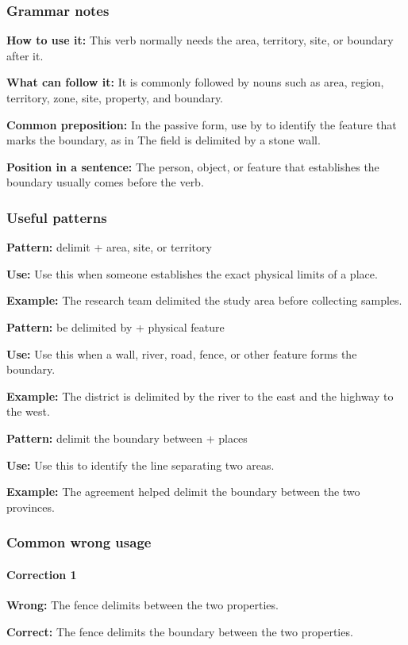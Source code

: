 \documentclass[11pt]{article}
\begin{document}
\subsubsection{Grammar notes}
\textbf{How to use it:} This verb normally needs the area, territory, site, or boundary after it.

\textbf{What can follow it:} It is commonly followed by nouns such as area, region, territory, zone, site, property, and boundary.

\textbf{Common preposition:} In the passive form, use by to identify the feature that marks the boundary, as in The field is delimited by a stone wall.

\textbf{Position in a sentence:} The person, object, or feature that establishes the boundary usually comes before the verb.

\subsubsection{Useful patterns}
\textbf{Pattern:} delimit + area, site, or territory

\textbf{Use:} Use this when someone establishes the exact physical limits of a place.

\textbf{Example:} The research team delimited the study area before collecting samples.

\textbf{Pattern:} be delimited by + physical feature

\textbf{Use:} Use this when a wall, river, road, fence, or other feature forms the boundary.

\textbf{Example:} The district is delimited by the river to the east and the highway to the west.

\textbf{Pattern:} delimit the boundary between + places

\textbf{Use:} Use this to identify the line separating two areas.

\textbf{Example:} The agreement helped delimit the boundary between the two provinces.

\subsubsection{Common wrong usage}
\paragraph{Correction 1}
\textbf{Wrong:} The fence delimits between the two properties.

\textbf{Correct:} The fence delimits the boundary between the two properties.
\end{document}
